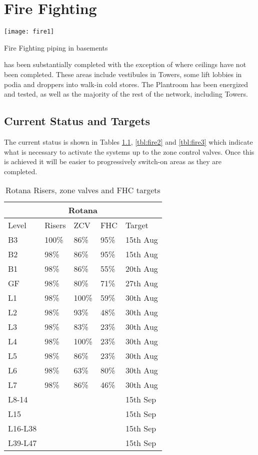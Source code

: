 
\chapter{Fire Fighting}
\begin{marginfigure}
  \texttt{[image: fire1]}
  \caption{Fire Fighting piping in basements}
  \label{fig:marginfig1}
\end{marginfigure}

 has been substantially
completed with the exception of where ceilings have not been completed. These areas include vestibules in Towers, some lift lobbies in podia and droppers into walk-in cold stores. The
Plantroom has been energized and tested, as well as the majority of the rest of the network, including Towers.

 

\section{Current Status and Targets}

The current status is shown in Tables \ref{tbl:fire1}, \ref{tbl:fire2} and \ref{tbl:fire3} which indicate what is necessary to activate the systems up to 
the zone control valves. Once this is achieved it will be easier to progressively switch-on areas as they are completed.
\begin{table}[htbp]\label{tbl:fire1}
\begin{center}
\begin{tabular}{lllll}
\toprule
\multicolumn{5}{c}{Rotana}\\
\midrule
Level	&Risers &ZCV	&FHC  &Target\\
\midrule
B3	&100\% &86\%	 &95\%  &15th Aug\\
B2	&98\%	  &86\%	&95\%   &15th Aug\\
\midrule
B1	&98\%	 &86\%	&55\%  &20th Aug\\
GF	&98\%	 &80\%	&71\%  &27th Aug\\
\midrule
L1	&98\%	 &100\%	&59\%  &30th Aug\\
L2	&98\%	 &93\%	&48\%  &30th Aug\\
L3	&98\%	 &83\%	&23\%  &30th Aug\\
L4	&98\%	 &100\%	&23\%  &30th Aug\\
L5	&98\%	 &86\%	&23\%  &30th Aug\\
L6	&98\%	 &63\%	&80\%  &30th Aug\\
L7	&98\%	&86\%	&46\%              &30th Aug\\
\midrule
L8-14	&         &          &      &15th Sep\\ 	 	 
L15	&        &           &      &15th Sep\\ 	 	 
L16-L38 &      &           &      &15th Sep\\	 	 	 
L39-L47 &      &           &      &15th Sep\\	 	 	 
\bottomrule
\end{tabular}
\caption{Rotana Risers, zone valves and FHC targets}
\end{center}
\end{table}

